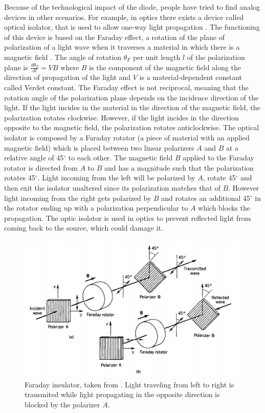 Because of the technological impact of the diode, people have tried to find analog devices in other scenarios. For example, in optics there exists a device called optical isolator, that is used to allow one-way light propagation \cite{Saleh1991}. The functioning of this device is based on the Faraday effect, a rotation of the plane of polarization of a light wave when it traverses a material in which there is a magnetic field \cite{Yariv1984}. The angle of rotation $\theta_F$ per unit length $l$ of the polarization plane is $\frac{d\theta_F}{dl} = V B$ where $B$ is the component of the magnetic field along the direction of propagation of the light and $V$ is a material-dependent constant called Verdet constant. The Faraday effect is not reciprocal, meaning that the rotation angle of the polarization plane depends on the incidence direction of the light. If the light incides in the material in the direction of the magnetic field, the polarization rotates clockwise. However, if the light incides in the direction opposite to the magnetic field, the polarization rotates anticlockwise. The optical isolator is composed by a Faraday rotator (a piece of material with an applied magnetic field) which is placed between two linear polarizers $A$ and $B$ at a relative angle of 45$^\circ$ to each other. The magnetic field $B$ applied to the Faraday rotator is directed from $A$ to $B$ and has a magnitude such that the polarization rotates 45$^\circ$. Light incoming from the left will be polarized by $A$, rotate 45$^\circ$ and then exit the isolator unaltered since its polarization matches that of $B$. However light incoming from the right gets polarized by $B$ and rotates an additional 45$^\circ$ in the rotator ending up with a polarization perpendicular to $A$ which blocks the propagation. The optic isolator is used in optics to prevent reflected light from coming back to the source, which could damage it.

\begin{figure}
  \center
  \includegraphics[width = 0.75\columnwidth]{Figures/Faraday-Insulator.png}
  \caption{Faraday insulator, taken from \cite{Saleh1991}. Light traveling from left to right is transmited while light propagating in the opposite direction is blocked by the polarizer $A$.}
  \label{fig:Faraday-insulator}
\end{figure}

